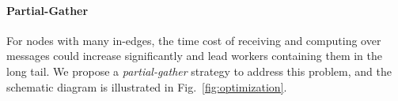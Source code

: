 \documentclass[conference]{IEEEtran}
\begin{document}
%
%
\paragraph{\textbf{Partial-Gather}}
For nodes with many in-edges, the time cost of receiving and computing over messages could increase significantly and lead workers containing them in the long tail.
We propose a \emph{partial-gather} strategy to address this problem, and the schematic diagram is illustrated in Fig.~\ref{fig:optimization}.
\end{document}

